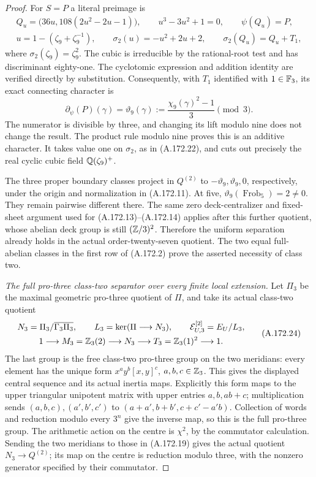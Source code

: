 \begin{proof}
For \(S=P\) a literal preimage is
\[
 \begin{gathered}
 Q_u=\bigl(36u,108(2u^2-2u-1)\bigr),\qquad
          u^3-3u^2+1=0,\qquad \psi(Q_u)=P,\\
 u=1-(\zeta_9+\zeta_9^{-1}),\qquad
 \sigma_2(u)=-u^2+2u+2,\qquad
             \sigma_2(Q_u)=Q_u+T_1 ,
 \end{gathered}
\tag{A.172.22}
\]
where \(\sigma_2(\zeta_9)=\zeta_9^2\).  The cubic is
irreducible by the rational-root test and has discriminant
eighty-one.  The cyclotomic expression and addition identity are
verified directly by substitution.  Consequently, with \(T_1\)
identified with \(1\in\mathbb F_3\), its exact connecting character is
\[
       \partial_\psi(P)(\gamma)
           =\vartheta_9(\gamma)
           :=\frac{\chi_9(\gamma)^2-1}{3}\pmod3.
\tag{A.172.23}
\]
The numerator is divisible by three, and changing its lift modulo
nine does not change the result.  The product rule modulo nine
proves this is an additive character.  It takes value one on
\(\sigma_2\), as in (A.172.22), and cuts out precisely the
real cyclic cubic field \(\mathbb Q(\zeta_9)^+\).

The three proper boundary classes project in \(Q^{(2)}\) to
\(-\vartheta_9,\vartheta_9,0\), respectively, under the origin
and normalization in (A.172.11).  At five,
\(\vartheta_9(\operatorname{Frob}_5)=2\ne0\).
They remain pairwise different there.  The same zero deck-centralizer
and fixed-sheet argument used for (A.172.13)--(A.172.14) applies
after this further quotient, whose abelian deck group is still
\((\mathbb Z/3)^2\).  Therefore the uniform separation already holds
in the actual order-twenty-seven quotient.  The two equal
full-abelian classes in the first row of (A.172.2) prove the
asserted necessity of class two.

\emph{The full pro-three class-two separator over every finite local
extension.}
Let \(\Pi_3\) be the maximal geometric pro-three quotient of
\(\Pi\), and take its actual class-two quotient
\[
 \begin{gathered}
 N_3=\Pi_3/\overline{\Gamma_3\Pi_3},\qquad
 L_3=\ker(\Pi\longrightarrow N_3),\qquad
 \mathcal E_{U,3}^{[2]}=E_U/L_3,\\
 1\longrightarrow M_3=\mathbb Z_3(2)\longrightarrow N_3
       \longrightarrow T_3=\mathbb Z_3(1)^2\longrightarrow1 .
 \end{gathered}
\tag{A.172.24}
\]
The last group is the free class-two pro-three group on the two
meridians: every element has the unique form
\(x^a y^b[x,y]^c\), \(a,b,c\in\mathbb Z_3\).  This gives the
displayed central sequence and its actual inertia maps.
Explicitly this form maps to the upper triangular unipotent
matrix with upper entries \(a,b,ab+c\); multiplication sends
\((a,b,c),(a',b',c')\) to
\((a+a',b+b',c+c'-a'b)\).
Collection of words and reduction modulo every \(3^n\)
give the inverse map, so this is the full pro-three group.
The arithmetic action on the centre is \(\chi^2\), by the
commutator calculation.  Sending the two meridians to those in
(A.172.19) gives the actual quotient \(N_3\to Q^{(2)}\);
its map on the centre is reduction modulo three, with the
nonzero generator specified by their commutator.


\end{proof}
